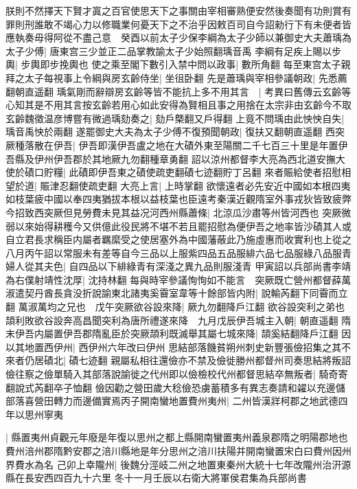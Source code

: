 朕則不然擇天下賢才寘之百官使思天下之事關由宰相審熟便安然後奏聞有功則賞有罪則刑誰敢不竭心力以修職業何憂天下之不治乎因敕百司自今詔勑行下有未便者皆應執奏毋得阿從不盡己意　癸酉以前太子少保李綱為太子少師以兼御史大夫蕭瑀為太子少傅|{
	唐東宫三少並正二品掌教諭太子少始照翻瑀音禹}
李綱有足疾上賜以步輿|{
	步輿即步挽輿也}
使之乘至閣下數引入禁中問以政事|{
	數所角翻}
每至東宫太子親拜之太子每視事上令綱與房玄齡侍坐|{
	坐徂卧翻}
先是蕭瑀與宰相參議朝政|{
	先悉薦翻朝直遥翻}
瑀氣剛而辭辯房玄齡等皆不能抗上多不用其言　|{
	考異曰舊傳云玄齡等心知其是不用其言按玄齡若用心如此安得為賢相且事之用捨在太宗非由玄齡今不取}
玄齡魏徵温彦博嘗有微過瑀劾奏之|{
	劾戶槩翻又戶得翻}
上竟不問瑀由此怏怏自失|{
	瑀音禹怏於兩翻}
遂罷御史大夫為太子少傅不復預聞朝政|{
	復扶又翻朝直遥翻}
西突厥種落散在伊吾|{
	伊吾即漢伊吾盧之地在大磧外東至陽關二千七百三十里是年置伊吾縣及伊州伊吾郡於其地厥九勿翻種章勇翻}
詔以涼州都督李大亮為西北道安撫大使於磧口貯糧|{
	此磧即伊吾東之磧使疏吏翻磧七迹翻貯丁呂翻}
來者賑給使者招慰相望於道|{
	賑津忍翻使疏吏翻}
大亮上言|{
	上時掌翻}
欲懷遠者必先安近中國如本根四夷如枝葉疲中國以奉四夷猶拔本根以益枝葉也臣遠考秦漢近觀隋室外事戎狄皆致疲弊今招致西突厥但見勞費未見其益况河西州縣蕭條|{
	北涼瓜沙肅等州皆河西也}
突厥微弱以來始得耕穫今又供億此役民將不堪不若且罷招慰為便伊吾之地率皆沙磧其人或自立君長求稱臣内屬者羈縻受之使居塞外為中國藩蔽此乃施虛惠而收實利也上從之　八月丙午詔以常服未有差等自今三品以上服紫四品五品服緋六品七品服綠八品服青婦人從其夫色|{
	自四品以下緋綠青有深淺之異九品則服淺青}
甲寅詔以兵部尚書李靖為右僕射靖性沈厚|{
	沈持林翻}
每與時宰參議恂恂如不能言　突厥既亡營州都督薛萬淑遣契丹酋長貪没折說諭東北諸夷奚霫室韋等十餘部皆内附|{
	說輸芮翻下同霫而立翻}
萬淑萬均之兄也　戊午突厥欲谷設來降|{
	厥九勿翻降戶江翻}
欲谷設突利之弟也頡利敗欲谷設奔高昌聞突利為唐所禮遂來降　九月戊辰伊吾城主入朝|{
	朝直遥翻}
隋末伊吾内屬置伊吾郡隋亂臣於突厥頡利既滅舉其屬七城來降|{
	頡奚結翻降戶江翻}
因以其地置西伊州|{
	西伊州六年改曰伊州}
思結部落饑貧朔州刺史新豐張儉招集之其不來者仍居磧北|{
	磧七迹翻}
親屬私相往還儉亦不禁及儉徙勝州都督州司奏思結將叛詔儉往察之儉單騎入其部落說諭徙之代州即以儉檢校代州都督思結卒無叛者|{
	騎奇寄翻說式芮翻卒子恤翻}
儉因勸之營田歲大稔儉恐虜蓄積多有異志奏請和糴以充邊儲部落喜營田轉力而邊備實焉丙子開南蠻地置費州夷州|{
	二州皆漢牂柯郡之地武德四年以思州寧夷}


|{
	縣置夷州貞觀元年廢是年復以思州之都上縣開南蠻置夷州義泉郡隋之明陽郡地也費州涪州郡隋黔安郡之涪川縣地是年分思州之涪川扶陽并開南蠻置宋白曰費州因州界費水為名}
己卯上幸隴州|{
	後魏分涇岐二州之地置東秦州大統十七年改隴州治汧源縣在長安西四百九十六里}
冬十一月壬辰以右衛大將軍侯君集為兵部尚書

